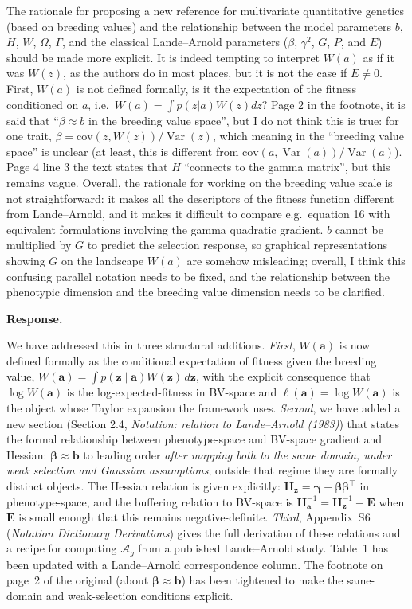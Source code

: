 \documentclass[11pt,a4paper]{article}
\newcommand{\response}{%
  \par\medskip\noindent\textbf{\color{ResponseColor}Response.}\quad\ignorespaces
}
\newcommand{\Ag}{\ensuremath{\mathcal{A}_{g}}\xspace}
\newcommand{\mat}[1]{\ensuremath{\mathbf{#1}}}
\newcommand{\vect}[1]{\ensuremath{\bm{#1}}}
\newcommand{\Var}{\ensuremath{\operatorname{Var}}\xspace}
\begin{document}
\begin{revquote}
The rationale for proposing a new reference for multivariate quantitative genetics (based on breeding values) and the relationship between the model parameters $b$, $H$, $W$, $\Omega$, $\Gamma$, and the classical Lande--Arnold parameters ($\beta$, $\gamma^2$, $G$, $P$, and $E$) should be made more explicit. It is indeed tempting to interpret $W(a)$ as if it was $W(z)$, as the authors do in most places, but it is not the case if $E \neq 0$. First, $W(a)$ is not defined formally, is it the expectation of the fitness conditioned on $a$, i.e.\ $W(a) = \int p(z|a)W(z)dz$? Page 2 in the footnote, it is said that ``$\beta \approx b$ in the breeding value space'', but I do not think this is true: for one trait, $\beta = \mathrm{cov}(z, W(z))/\Var(z)$, which meaning in the ``breeding value space'' is unclear (at least, this is different from $\mathrm{cov}(a, \Var(a))/\Var(a)$). Page 4 line 3 the text states that $H$ ``connects to the gamma matrix'', but this remains vague. Overall, the rationale for working on the breeding value scale is not straightforward: it makes all the descriptors of the fitness function different from Lande--Arnold, and it makes it difficult to compare e.g.\ equation 16 with equivalent formulations involving the gamma quadratic gradient. $b$ cannot be multiplied by $G$ to predict the selection response, so graphical representations showing $G$ on the landscape $W(a)$ are somehow misleading; overall, I think this confusing parallel notation needs to be fixed, and the relationship between the phenotypic dimension and the breeding value dimension needs to be clarified.
\end{revquote}

\response
We have addressed this in three structural additions. \textit{First}, $W(\vect{a})$ is now defined formally as the conditional expectation of fitness given the breeding value, $W(\vect{a}) = \int p(\vect{z} \mid \vect{a}) W(\vect{z})\,d\vect{z}$, with the explicit consequence that $\log W(\vect{a})$ is the log-expected-fitness in BV-space and $\ell(\vect{a}) = \log W(\vect{a})$ is the object whose Taylor expansion the framework uses. \textit{Second}, we have added a new section (Section 2.4, \textit{Notation: relation to Lande--Arnold (1983)}) that states the formal relationship between phenotype-space and BV-space gradient and Hessian: $\bm{\beta} \approx \vect{b}$ to leading order \emph{after mapping both to the same domain, under weak selection and Gaussian assumptions}; outside that regime they are formally distinct objects. The Hessian relation is given explicitly: $\mat{H}_{\vect{z}} = \bm{\gamma} - \bm{\beta}\bm{\beta}^{\top}$ in phenotype-space, and the buffering relation to BV-space is $\mat{H}_{\vect{a}}^{-1} = \mat{H}_{\vect{z}}^{-1} - \mat{E}$ when $\mat{E}$ is small enough that this remains negative-definite. \textit{Third}, Appendix~S6 (\textit{Notation Dictionary Derivations}) gives the full derivation of these relations and a recipe for computing $\Ag$ from a published Lande--Arnold study. Table~1 has been updated with a Lande--Arnold correspondence column. The footnote on page~2 of the original (about $\bm{\beta} \approx \vect{b}$) has been tightened to make the same-domain and weak-selection conditions explicit.
\end{document}
